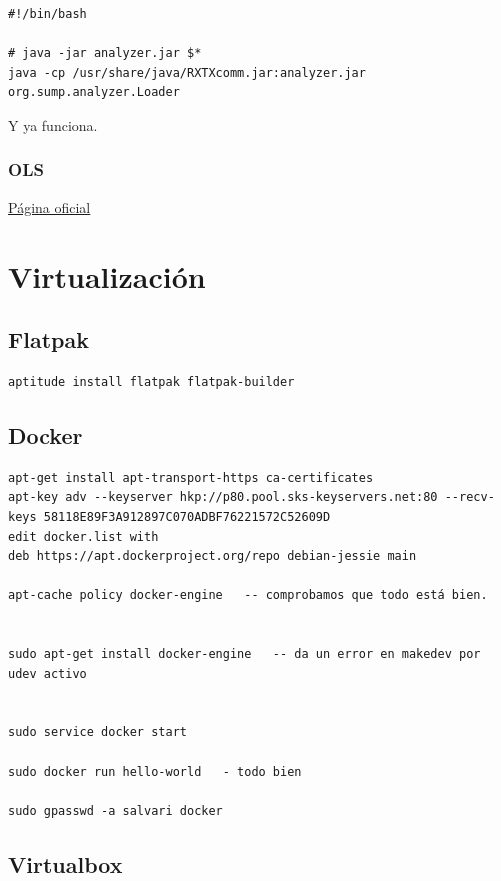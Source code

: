 \documentclass[12pt,spanish,]{scrartcl}
\begin{document}
\begin{verbatim}
#!/bin/bash

# java -jar analyzer.jar $*
java -cp /usr/share/java/RXTXcomm.jar:analyzer.jar org.sump.analyzer.Loader
\end{verbatim}

Y ya funciona.

\hypertarget{ols}{%
\subsubsection{OLS}\label{ols}}

\href{https://www.lxtreme.nl/ols/}{Página oficial}

\hypertarget{virtualizaciuxf3n}{%
\section{Virtualización}\label{virtualizaciuxf3n}}

\hypertarget{flatpak}{%
\subsection{Flatpak}\label{flatpak}}

\begin{verbatim}
aptitude install flatpak flatpak-builder
\end{verbatim}

\hypertarget{docker}{%
\subsection{Docker}\label{docker}}

\begin{verbatim}
apt-get install apt-transport-https ca-certificates
apt-key adv --keyserver hkp://p80.pool.sks-keyservers.net:80 --recv-keys 58118E89F3A912897C070ADBF76221572C52609D
edit docker.list with
deb https://apt.dockerproject.org/repo debian-jessie main

apt-cache policy docker-engine   -- comprobamos que todo está bien.


sudo apt-get install docker-engine   -- da un error en makedev por udev activo


sudo service docker start

sudo docker run hello-world   - todo bien

sudo gpasswd -a salvari docker
\end{verbatim}

\hypertarget{virtualbox}{%
\subsection{Virtualbox}\label{virtualbox}}
\end{document}
